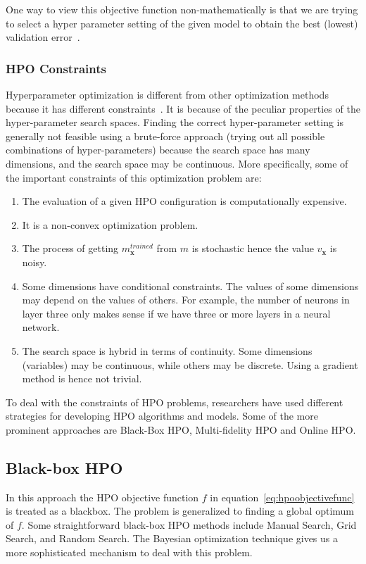 \documentclass[12pt, twoside, ngerman]{report}
\begin{document}
One way to view this objective function non-mathematically is that we are trying to select a hyper parameter setting of the given model to obtain the best (lowest) validation error~\cite{fsbopaper}.

\subsubsection{HPO Constraints}\label{sec:hpoConstraints}

Hyperparameter optimization is different from other optimization methods because it has different constraints~\cite{bayesianOptimizationTutorial}.
It is because of the peculiar properties of the hyper-parameter search spaces.
Finding the correct hyper-parameter setting is generally not feasible using a brute-force approach (trying out all possible combinations of hyper-parameters) because the search space has many dimensions, and the search space may be continuous.
More specifically,  some of the important constraints of this optimization problem are:

\begin{enumerate}
\item The evaluation of a given HPO configuration is computationally expensive.
\item It is a non-convex optimization problem.
\item The process of getting $m^{trained}_\textbf{x}$ from $m$ is stochastic hence the value $v_{\textbf{x}}$ is noisy.
\item Some dimensions have conditional constraints. The values of some dimensions may depend on the values of others. For example, the number of neurons in layer three only makes sense if we have three or more layers in a neural network.
\item The search space is hybrid in terms of continuity. Some dimensions (variables) may be continuous, while others may be discrete.
Using a gradient method is hence not trivial.
\end{enumerate}

To deal with the constraints of HPO problems, researchers have used different strategies for developing HPO algorithms and models.
Some of the more prominent approaches are Black-Box HPO, 
Multi-fidelity HPO and Online HPO.

\subsection{Black-box HPO}
In this approach the HPO objective function $f$ in equation~\ref{eq:hpoobjectivefunc}
is treated as a blackbox.
The problem is generalized to finding a global optimum of $f$.
Some straightforward black-box HPO methods include Manual Search,  Grid Search, and Random Search.
The Bayesian optimization technique gives us a more sophisticated mechanism to deal with this problem. 
\end{document}
